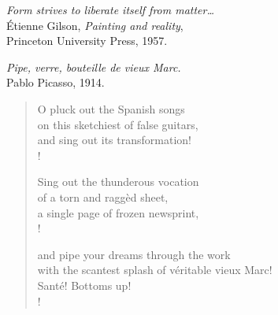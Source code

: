 
\begin{flushright}
\textit{Form strives to liberate itself from matter\ldots}\\
\'Etienne Gilson, \textit{Painting and reality},\\
Princeton University Press, 1957.
\end{flushright}

\begin{flushright}
\textit{Pipe, verre, bouteille de vieux Marc.}\\
Pablo Picasso, 1914.
\end{flushright}


\prelude

\begin{verse}

O pluck out the Spanish songs\\
on this sketchiest of false guitars,\\
and sing out its transformation!\\!

Sing out the thunderous vocation\\
of a torn and ragg\`ed sheet,\\
a single page of frozen newsprint,\\!

and pipe your dreams through the work\\
with the scantest splash of v\'eritable vieux Marc!\\
Sant\'e!  Bottoms up!\\!

\end{verse}

\fugue

